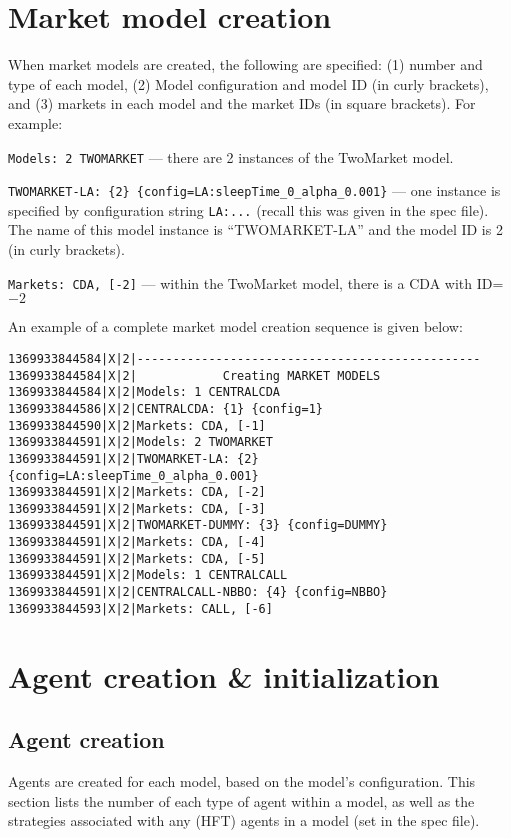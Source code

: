 \documentclass[11pt]{article}
\begin{document}
\section{Market model creation}

When market models are created, the following are specified: (1) number and type of each model, (2) Model configuration and model ID (in curly brackets), and (3) markets in each model and the market IDs (in square brackets).
%
For example: 
\begin{description}
\item \verb|Models: 2 TWOMARKET|  --- there are 2 instances of the TwoMarket model.
\item \verb|TWOMARKET-LA: {2} {config=LA:sleepTime_0_alpha_0.001}|  --- one instance is specified by configuration string \verb|LA:...| (recall this was given in the spec file). The name of this model instance is ``TWOMARKET-LA'' and the model ID is 2 (in curly brackets).

\item \verb|Markets: CDA, [-2]| --- within the TwoMarket model, there is a CDA with ID=$-2$ 
\end{description}

An example of a complete market model creation sequence is given below:
\begin{verbatim}
1369933844584|X|2|------------------------------------------------
1369933844584|X|2|            Creating MARKET MODELS
1369933844584|X|2|Models: 1 CENTRALCDA
1369933844586|X|2|CENTRALCDA: {1} {config=1}
1369933844590|X|2|Markets: CDA, [-1]
1369933844591|X|2|Models: 2 TWOMARKET
1369933844591|X|2|TWOMARKET-LA: {2} {config=LA:sleepTime_0_alpha_0.001}
1369933844591|X|2|Markets: CDA, [-2]
1369933844591|X|2|Markets: CDA, [-3]
1369933844591|X|2|TWOMARKET-DUMMY: {3} {config=DUMMY}
1369933844591|X|2|Markets: CDA, [-4]
1369933844591|X|2|Markets: CDA, [-5]
1369933844591|X|2|Models: 1 CENTRALCALL
1369933844591|X|2|CENTRALCALL-NBBO: {4} {config=NBBO}
1369933844593|X|2|Markets: CALL, [-6]
\end{verbatim}

\section{Agent creation \& initialization}

\subsection{Agent creation}
Agents are created for each model, based on the model's configuration. This section lists the number of each type of agent within a model, as well as the strategies associated with any (HFT) agents in a model (set in the spec file).
\end{document}
